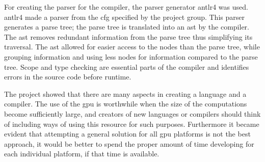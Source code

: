 For creating the parser for the compiler, the parser generator \acrshort{antlr}4 was used.
\acrshort{antlr}4 made a parser from the \acrshort{cfg} specified by the project group.
This parser generates a parse tree; the parse tree is translated into an \acrshort{ast} by the compiler.
The \acrshort{ast} removes redundant information from the parse tree thus simplifying its traversal.
The \acrshort{ast} allowed for easier access to the nodes than the parse tree, while grouping information and using less nodes for information compared to the parse tree.
Scope and type checking are essential parts of the compiler and identifies errors in the source code before runtime.

The project showed that there are many aspects in creating a language and a compiler.
The use of the \acrshort{gpu} is worthwhile when the size of the computations become sufficiently large, and creators of new languages or compilers should think of including ways of using this resource for such purposes.
Furthermore it became evident that attempting a general solution for all \acrshort{gpu} platforms is not the best approach, it would be better to spend the proper amount of time developing for each individual platform, if that time is available.